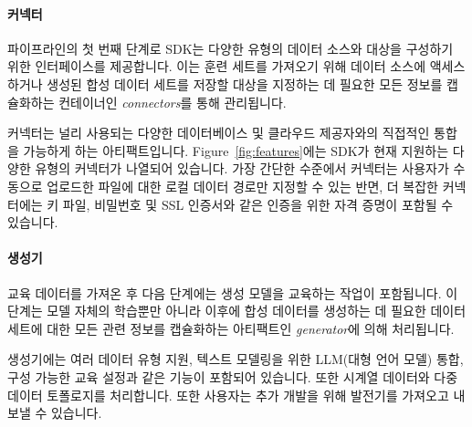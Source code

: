 \paragraph{커넥터}
파이프라인의 첫 번째 단계로 SDK는 다양한 유형의 데이터 소스와 대상을 구성하기 위한 인터페이스를 제공합니다.
이는 훈련 세트를 가져오기 위해 데이터 소스에 액세스하거나 생성된 합성 데이터 세트를 저장할 대상을 지정하는 데 필요한 모든 정보를 캡슐화하는 컨테이너인 \emph{connectors}를 통해 관리됩니다.

커넥터는 널리 사용되는 다양한 데이터베이스 및 클라우드 제공자와의 직접적인 통합을 가능하게 하는 아티팩트입니다.
Figure~\ref{fig:features}에는 SDK가 현재 지원하는 다양한 유형의 커넥터가 나열되어 있습니다.
가장 간단한 수준에서 커넥터는 사용자가 수동으로 업로드한 파일에 대한 로컬 데이터 경로만 지정할 수 있는 반면, 더 복잡한 커넥터에는 키 파일, 비밀번호 및 SSL 인증서와 같은 인증을 위한 자격 증명이 포함될 수 있습니다.


\paragraph{생성기}
교육 데이터를 가져온 후 다음 단계에는 생성 모델을 교육하는 작업이 포함됩니다.
이 단계는 모델 자체의 학습뿐만 아니라 이후에 합성 데이터를 생성하는 데 필요한 데이터 세트에 대한 모든 관련 정보를 캡슐화하는 아티팩트인 \emph{generator}에 의해 처리됩니다.

생성기에는 여러 데이터 유형 지원, 텍스트 모델링을 위한 LLM(대형 언어 모델) 통합, 구성 가능한 교육 설정과 같은 기능이 포함되어 있습니다.
또한 시계열 데이터와 다중 데이터 토폴로지를 처리합니다.
또한 사용자는 추가 개발을 위해 발전기를 가져오고 내보낼 수 있습니다.


